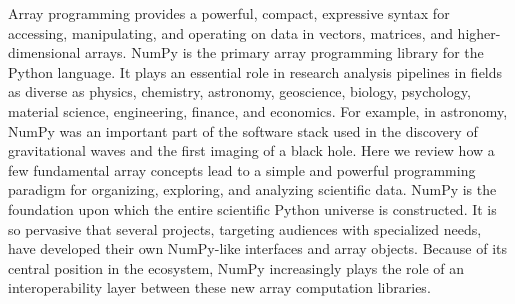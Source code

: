 




Array programming provides a powerful, compact, expressive syntax for accessing,
manipulating, and operating on data in vectors, matrices, and
higher-dimensional arrays. %
NumPy is the primary array programming library for the Python language.
It plays an essential role in research analysis pipelines in fields as
diverse as physics, chemistry, astronomy, geoscience, biology, psychology,
material science, engineering, finance, and economics.
For example, in astronomy, NumPy was an important part of the software stack used
in the discovery of gravitational waves%
and the first imaging of a black hole. %
Here we review how a few fundamental array concepts lead to a simple and
powerful programming paradigm for organizing, exploring, and analyzing
scientific data.
NumPy is the foundation upon which the entire scientific Python
universe is constructed. It is so pervasive that several projects,
targeting audiences with specialized needs, have developed their own
NumPy-like interfaces and array objects. Because of its central position in the
ecosystem, NumPy increasingly plays the role of an interoperability layer
between these new array computation libraries.

